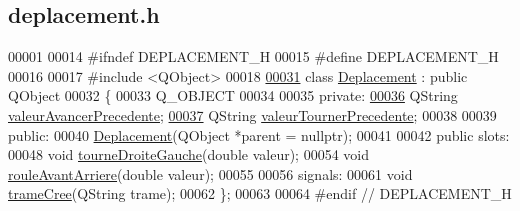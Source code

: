 \hypertarget{deplacement_8h_source}{}\subsection{deplacement.\+h}

\begin{DoxyCode}
00001 
00014 \textcolor{preprocessor}{#ifndef DEPLACEMENT\_H}
00015 \textcolor{preprocessor}{#define DEPLACEMENT\_H}
00016 
00017 \textcolor{preprocessor}{#include <QObject>}
00018 
\hyperlink{class_deplacement}{00031} \textcolor{keyword}{class }\hyperlink{class_deplacement}{Deplacement} : \textcolor{keyword}{public} QObject
00032 \{
00033     Q\_OBJECT
00034 
00035     \textcolor{keyword}{private}:
\hyperlink{class_deplacement_a419b8bb201dc4a4e927beed68923f8eb}{00036}         QString \hyperlink{class_deplacement_a419b8bb201dc4a4e927beed68923f8eb}{valeurAvancerPrecedente}; 
\hyperlink{class_deplacement_a9d9b191747038f0f410626f38c4e75be}{00037}         QString \hyperlink{class_deplacement_a9d9b191747038f0f410626f38c4e75be}{valeurTournerPrecedente}; 
00038 
00039     \textcolor{keyword}{public}:
00040         \hyperlink{class_deplacement_a473f623358ffa95ac7385b49f128d23c}{Deplacement}(QObject *parent = \textcolor{keyword}{nullptr});
00041 
00042     \textcolor{keyword}{public} slots:
00048         \textcolor{keywordtype}{void} \hyperlink{class_deplacement_a164cc606a6c5b8d55c1e5475d4d112e0}{tourneDroiteGauche}(\textcolor{keywordtype}{double} valeur);
00054         \textcolor{keywordtype}{void} \hyperlink{class_deplacement_a65a1c6adfe5114d3cfefa631e0c91618}{rouleAvantArriere}(\textcolor{keywordtype}{double} valeur);
00055 
00056     signals:
00061         \textcolor{keywordtype}{void} \hyperlink{class_deplacement_ae1a6d4a98304dee19d426ceeb6b7d5bb}{trameCree}(QString trame);
00062 \};
00063 
00064 \textcolor{preprocessor}{#endif // DEPLACEMENT\_H}
\end{DoxyCode}
